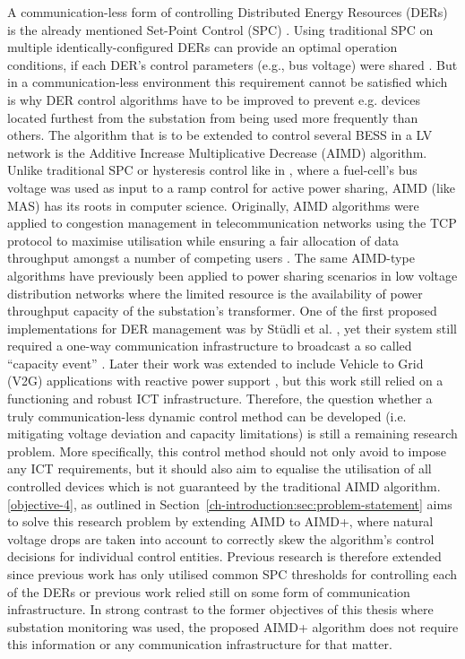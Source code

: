 A communication-less form of controlling Distributed Energy Resources (DERs) is the already mentioned Set-Point Control (SPC) \cite{Leadbetter2012}.
Using traditional SPC on multiple identically-configured DERs can provide an optimal operation conditions, if each DER's control parameters (e.g., bus voltage) were shared \cite{Thieblemont2017a}.
But in a communication-less environment this requirement cannot be satisfied which is why DER control algorithms have to be improved to prevent e.g. devices located furthest from the substation from being used more frequently than others.
The algorithm that is to be extended to control several BESS in a LV network is the Additive Increase Multiplicative Decrease (AIMD) algorithm.
Unlike traditional SPC or hysteresis control like in \cite{Jiang2007}, where a fuel-cell's bus voltage was used as input to a ramp control for active power sharing, AIMD (like MAS) has its roots in computer science.
Originally, AIMD algorithms were applied to congestion management in telecommunication networks using the TCP protocol \cite{Chiu1989} to maximise utilisation while ensuring a fair allocation of data throughput amongst a number of competing users \cite{Wirth2014}.
The same AIMD-type algorithms have previously been applied to power sharing scenarios in low voltage distribution networks where the limited resource is the availability of power throughput capacity of the substation's transformer.
One of the first proposed implementations for DER management was by St{\"{u}}dli et al. \cite{Studli2012}, yet their system still required a one-way communication infrastructure to broadcast a so called ``capacity event'' \cite{Studli2014, Studli2014a}.
Later their work was extended to include Vehicle to Grid (V2G) applications with reactive power support \cite {Studli2015}, but this work still relied on a functioning and robust ICT infrastructure.
Therefore, the question whether a truly communication-less dynamic control method can be developed (i.e. mitigating voltage deviation and capacity limitations) is still a remaining research problem.
More specifically, this control method should not only avoid to impose any ICT requirements, but it should also aim to equalise the utilisation of all controlled devices which is not guaranteed by the traditional AIMD algorithm.
\ref{objective-4}, as outlined in Section~\ref{ch-introduction:sec:problem-statement} aims to solve this research problem by extending AIMD to AIMD+, where natural voltage drops are taken into account to correctly skew the algorithm's control decisions for individual control entities.
Previous research is therefore extended since previous work has only utilised common SPC thresholds for controlling each of the DERs or previous work relied still on some form of communication infrastructure.
In strong contrast to the former objectives of this thesis where substation monitoring was used, the proposed AIMD+ algorithm does not require this information or any communication infrastructure for that matter.
